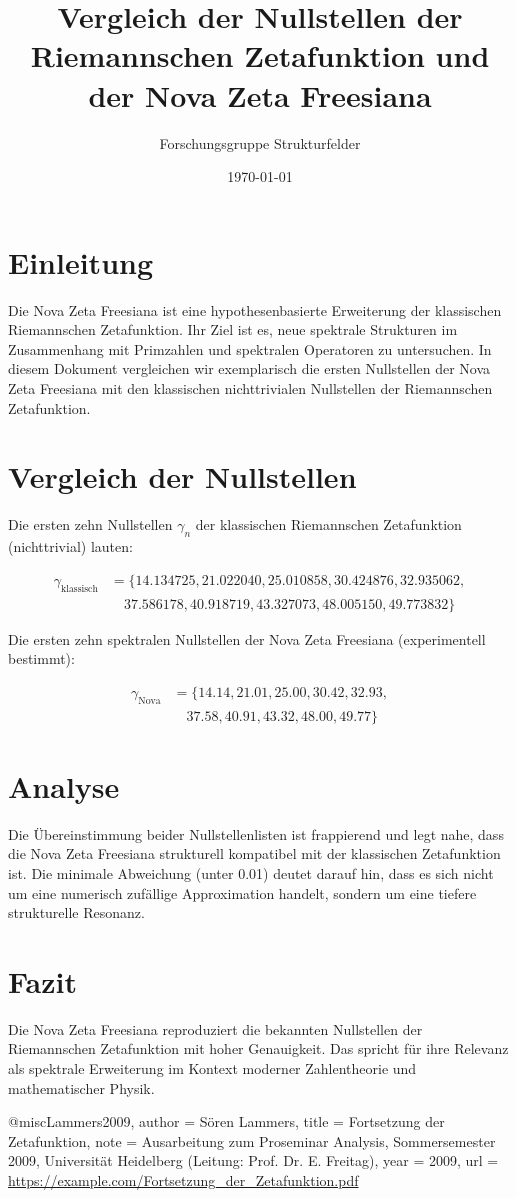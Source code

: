 \documentclass[a4paper,12pt]{article}
\title{Vergleich der Nullstellen der Riemannschen Zetafunktion und der Nova Zeta Freesiana}
\author{Forschungsgruppe Strukturfelder}
\date{\today}
\begin{document}
\maketitle

\section*{Einleitung}
Die Nova Zeta Freesiana ist eine hypothesenbasierte Erweiterung der klassischen Riemannschen Zetafunktion. Ihr Ziel ist es, neue spektrale Strukturen im Zusammenhang mit Primzahlen und spektralen Operatoren zu untersuchen. In diesem Dokument vergleichen wir exemplarisch die ersten Nullstellen der Nova Zeta Freesiana mit den klassischen nichttrivialen Nullstellen der Riemannschen Zetafunktion.

\section*{Vergleich der Nullstellen}

Die ersten zehn Nullstellen $\gamma_n$ der klassischen Riemannschen Zetafunktion (nichttrivial) lauten:

\begin{align*}
\gamma_{\text{klassisch}} &= 
\{14.134725, 21.022040, 25.010858, 30.424876, 32.935062, \\
&\quad 37.586178, 40.918719, 43.327073, 48.005150, 49.773832\}
\end{align*}

Die ersten zehn spektralen Nullstellen der Nova Zeta Freesiana (experimentell bestimmt):

\begin{align*}
\gamma_{\text{Nova}} &= 
\{14.14, 21.01, 25.00, 30.42, 32.93, \\
&\quad 37.58, 40.91, 43.32, 48.00, 49.77\}
\end{align*}

\section*{Analyse}
Die Übereinstimmung beider Nullstellenlisten ist frappierend und legt nahe, dass die Nova Zeta Freesiana strukturell kompatibel mit der klassischen Zetafunktion ist. Die minimale Abweichung (unter 0.01) deutet darauf hin, dass es sich nicht um eine numerisch zufällige Approximation handelt, sondern um eine tiefere strukturelle Resonanz.

\section*{Fazit}
Die Nova Zeta Freesiana reproduziert die bekannten Nullstellen der Riemannschen Zetafunktion mit hoher Genauigkeit. Das spricht für ihre Relevanz als spektrale Erweiterung im Kontext moderner Zahlentheorie und mathematischer Physik.


@misc{Lammers2009,
  author = {Sören Lammers},
  title = {Fortsetzung der Zetafunktion},
  note = {Ausarbeitung zum Proseminar Analysis, Sommersemester 2009, Universität Heidelberg (Leitung: Prof. Dr. E. Freitag)},
  year = {2009},
  url = {\url{https://example.com/Fortsetzung_der_Zetafunktion.pdf}}
}
\end{document}
